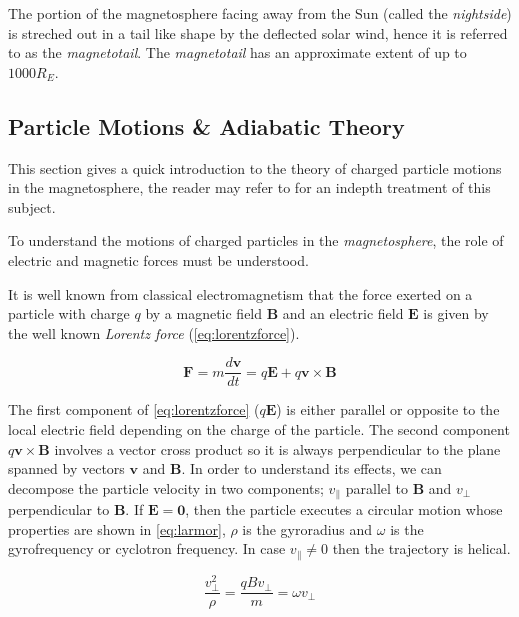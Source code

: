The portion of the magnetosphere facing away from the Sun (called the \emph{nightside}) is streched out in  
a tail like shape by the deflected solar wind, hence it is referred to as the \emph{magnetotail}. The 
\emph{magnetotail} has an approximate extent of up to $1000R_E$.


\subsection{Particle Motions \& Adiabatic Theory} \label{sec:plasmadiff}

This section gives a quick introduction to the theory of charged particle motions in the magnetosphere, the reader 
may refer to \citet{roederer2012dynamics} for an indepth treatment of this subject.

To understand the motions of charged particles in the \emph{magnetosphere}, the role of electric and magnetic 
forces must be understood.

It is well known from classical electromagnetism that the force exerted on a particle with charge $q$ by a 
magnetic field $\mathbf{B}$ and an electric field $\mathbf{E}$ is given by the well known \emph{Lorentz force} 
(\cref{eq:lorentzforce}).

\begin{equation}\label{eq:lorentzforce}
    \mathbf{F} = m\frac{d\mathbf{v}}{dt} = q\mathbf{E} + q\mathbf{v} \times \mathbf{B}
\end{equation}


The first component of \cref{eq:lorentzforce} ($q\mathbf{E}$) is either parallel or opposite to the local electric 
field depending on the charge of the particle. The second component $q\mathbf{v} \times \mathbf{B}$ involves a vector 
cross product so it is always perpendicular to the plane spanned by vectors $\mathbf{v}$ and $\mathbf{B}$. In order to 
understand its effects, we can decompose the particle velocity in two components; $v_{\parallel}$ parallel to $\mathbf{B}$ and 
$v_{\perp}$ perpendicular to $\mathbf{B}$. If $\mathbf{E} = \mathbf{0}$, then the particle executes a circular motion 
whose properties are shown in \cref{eq:larmor}, $\rho$ is the gyroradius and $\omega$ is the gyrofrequency or 
cyclotron frequency. In case $v_{\parallel} \neq 0$ then the trajectory is helical.

\begin{equation}\label{eq:larmor}
    \frac{v^{2}_{\perp}}{\rho} = \frac{qBv_{\perp}}{m} = \omega v_{\perp}
\end{equation}


